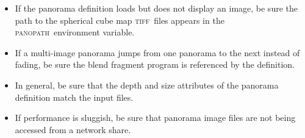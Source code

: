 \documentclass[article,twocolumn,10pt]{memoir}
\newcommand{\tiff}    {\textsc{tiff}}
\newcommand{\panopath}{\textsc{panopath}}
\begin{document}
\begin{Spacing}{1.1}
\begin{itemize}
\item If the panorama definition loads but does not display an image, be sure the path to the spherical cube map \tiff\ files appears in the \panopath\ environment variable.

\item If a multi-image panorama jumps from one panorama to the next instead of fading, be sure the blend fragment program is referenced by the definition.

\item In general, be sure that the depth and size attributes of the panorama definition match the input files.

\item If performance is sluggish, be sure that panorama image files are not being accessed from a network share.
\end{itemize}

\end{Spacing}
\end{document}
